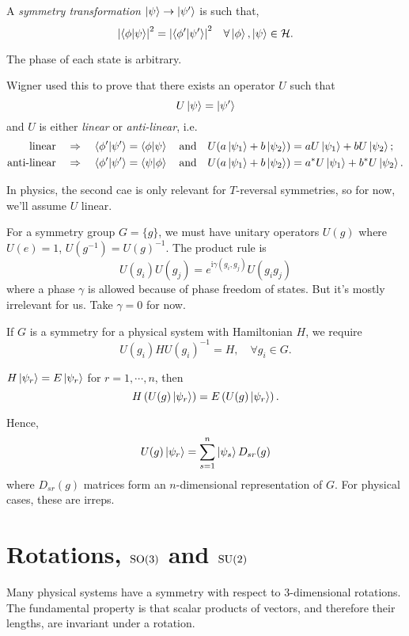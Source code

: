 \documentclass[a4paper,11pt]{article}
\begin{document}
	\begin{defi}
		A \emph{symmetry transformation} $\ket \psi \to \ket{\psi'}$ is such that, 
		\[
			\abs{\braket{\phi}{\psi}}^2 = \abs{\braket{\phi'}{\psi'}}^2 \quad \forall \ket{\phi}, \ket{\psi} \in \mathcal{H}.
		\]
		
		The phase of each state is arbitrary. 
	\end{defi}
	
	Wigner used this to prove that there exists an operator $U$ such that
	\[
		U \ket{\psi} = \ket{\psi'}
	\]
	and $U$ is either \emph{linear} or \emph{anti-linear}, i.e.\ 
	\begin{align*}
		\text{linear} \quad & \Rightarrow \quad \braket{\phi'}{\psi'} = \braket{\phi}{\psi} \quad \text{and} \quad U(a \ket{\psi_1} + b \ket{\psi_2}) = a U \ket{\psi_1} + b U \ket{\psi_2};\\
		\text{anti-linear} \quad & \Rightarrow \quad \braket{\phi'}{\psi'} = \braket{\psi}{\phi} \quad \text{and} \quad U(a \ket{\psi_1} + b \ket{\psi_2}) = a^* U \ket{\psi_1} + b^* U \ket{\psi_2}.
	\end{align*}
	
	In physics, the second cae is only relevant for $T$-reversal symmetries, so for now, we'll assume $U$ linear.

	For a symmetry group $G = \{g\}$, we must have unitary operators $U(g)$ where $U(e)=1$, $U(g^{-1})=U(g)^{-1}$. The product rule is 
	\[
		U(g_i)U(g_j)=e ^{\mathrm{i} \gamma(g_i,g_j)}U(g_i g_j)
	\]
	where a phase $\gamma$ is allowed because of phase freedom of states. But it's mostly irrelevant for us. Take $\gamma = 0$ for now.

	If $G$ is a symmetry for a physical system with Hamiltonian $H$, we require
	\[
		U(g_i)H U(g_i)^{-1} = H, \quad \forall g_i \in G.
	\]
	
	$H \ket{\psi_r} = E \ket{\psi_r}$ for $r = 1, \cdots, n$, then 
	\[
		H \left( U(g)\ket{\psi_r} \right) = E \left( U(g)\ket{\psi_r} \right).
	\]
	
	Hence,
	\[
		U(g)\ket{\psi_r} = \sum _{s=1}^n \ket{\psi_s}D _{sr}(g)
	\]
	where $D _{sr}(g)$ matrices form an $n$-dimensional representation of $G$. For physical cases, these are irreps.

	\newpage

	\section{Rotations, $\operatorname{SO}(3)$ and $\operatorname{SU}(2)$}

	Many physical systems have a symmetry with respect to 3-dimensional rotations. The fundamental property is that scalar products of vectors, and therefore their lengths, are invariant under a rotation.
\end{document}
